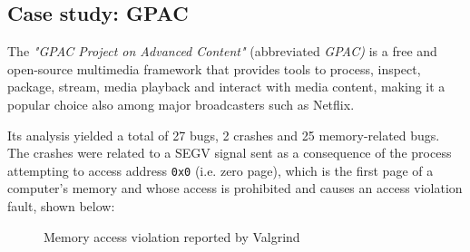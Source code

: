 \newpage
\subsection{Case study: GPAC}
The \textit{"GPAC Project on Advanced Content"} (abbreviated \textit{GPAC)} \cite{gpac} is a free and open-source multimedia framework that provides tools to process, inspect, package, stream, media playback and interact with media content, making it a popular choice also among major broadcasters such as Netflix.

Its analysis yielded a total of 27 bugs, 2 crashes and 25 memory-related bugs.
The crashes were related to a SEGV signal sent as a consequence of the process attempting to access address \verb|0x0| (i.e. zero page), which is the first page of a computer's memory and whose access is prohibited and causes an access violation fault, shown below:
\begin{figure}[h]
\caption{Memory access violation reported by Valgrind }
\label{fig:segv_gpac}
\end{figure}
